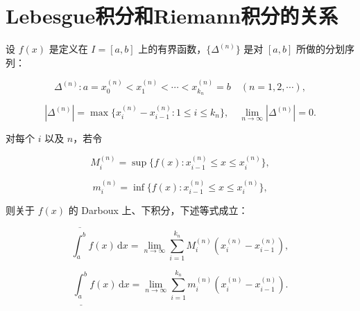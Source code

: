 \documentclass[../../main.tex]{subfiles}
\begin{document}
\section{Lebesgue积分和Riemann积分的关系}

\begin{definition}[Riemann积分相关定义]\label{definition:Riemann积分相关定义}
设 \( f(x) \) 是定义在 \( I = [a,b] \) 上的有界函数，\(\{ \Delta^{(n)} \}\) 是对 \([a,b]\) 所做的分划序列：

\[
\Delta^{(n)} : a = x_0^{(n)} < x_1^{(n)} < \cdots < x_{k_n}^{(n)} = b \quad (n = 1,2,\cdots),
\]

\[
|\Delta^{(n)}| = \max \{ x_i^{(n)} - x_{i - 1}^{(n)} : 1 \leqslant i \leqslant k_n \}, \quad \lim_{n \to \infty} |\Delta^{(n)}| = 0.
\]

对每个 \( i \) 以及 \( n \)，若令

\[
M_i^{(n)} = \sup \{ f(x) : x_{i - 1}^{(n)} \leqslant x \leqslant x_i^{(n)} \},
\]

\[
m_i^{(n)} = \inf \{ f(x) : x_{i - 1}^{(n)} \leqslant x \leqslant x_i^{(n)} \},
\]

则关于 \( f(x) \) 的 Darboux 上、下积分，下述等式成立：

\[
\overline{\int_a^b} f(x) \, \mathrm{d}x = \lim_{n \to \infty} \sum_{i = 1}^{k_n} M_i^{(n)} (x_i^{(n)} - x_{i - 1}^{(n)}),
\]

\[
\underline{\int_a^b} f(x) \, \mathrm{d}x = \lim_{n \to \infty} \sum_{i = 1}^{k_n} m_i^{(n)} (x_i^{(n)} - x_{i - 1}^{(n)}).
\]
\end{definition}
\end{document}

